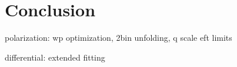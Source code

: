 \chapter{Conclusion}

polarization:
wp optimization, 2bin unfolding, q scale
eft limits

differential:
extended fitting
